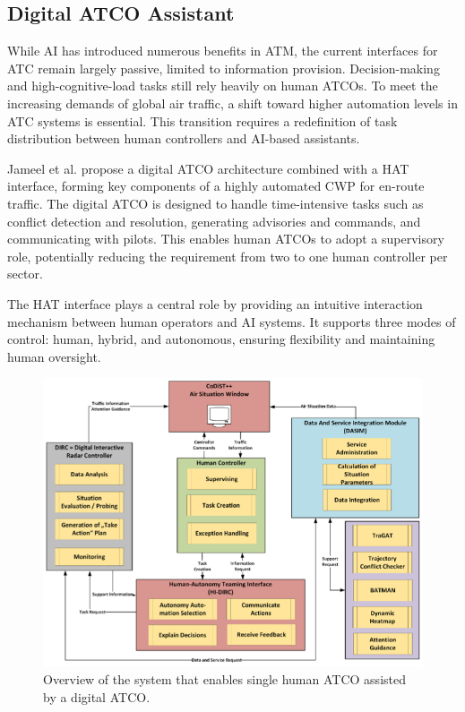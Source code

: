 \subsection{Digital ATCO Assistant}

While \gls{AI} has introduced numerous benefits in \gls{ATM}, the current interfaces for \gls{ATC} remain largely passive, limited to information provision. 
Decision-making and high-cognitive-load tasks still rely heavily on human \glspl{ATCO}. 
To meet the increasing demands of global air traffic, a shift toward higher automation levels in \gls{ATC} systems is essential. 
This transition requires a redefinition of task distribution between human controllers and \gls{AI}-based assistants.

Jameel et al. \cite{Jameel_2023} propose a digital \gls{ATCO} architecture combined with a \gls{HAT} interface, forming key components of a highly automated \gls{CWP} for en-route traffic. 
The digital \gls{ATCO} is designed to handle time-intensive tasks such as conflict detection and resolution, generating advisories and commands, and communicating with pilots. 
This enables human \glspl{ATCO} to adopt a supervisory role, potentially reducing the requirement from two to one human controller per sector.

The \gls{HAT} interface plays a central role by providing an intuitive interaction mechanism between human operators and \gls{AI} systems. 
It supports three modes of control: human, hybrid, and autonomous, ensuring flexibility and maintaining human oversight.

\begin{figure}[!ht]
    \centering
    \includegraphics[width=.7\textwidth]{img/digital-atco.png}
    \caption{Overview of the system that enables single human \gls{ATCO} assisted by a digital \gls{ATCO}. \cite{Jameel_2023}}
    \label{digital-atco}
\end{figure}

